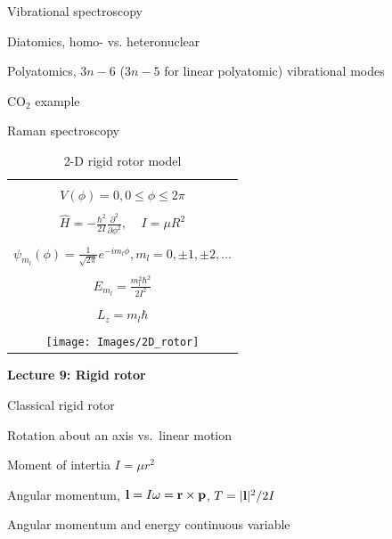 \documentclass[11pt]{article}
\begin{document}
\begin{outline}
\begin{outline}
    \item Vibrational spectroscopy
      \begin{outline}
        \item Diatomics, homo- vs. heteronuclear
        \item Polyatomics, $3n-6$ ($3n-5$ for linear polyatomic) vibrational modes
        \item CO$_2$ example
      \end{outline}

    \item Raman spectroscopy
 \end{outline}

\begin{table}[tbh]
   \begin{center}
   \caption{2-D rigid rotor model}
    \label{Rigid rotor}
\begin{tabular}[h]{|c|}
\hline
 \\
$\displaystyle       V(\phi) = 0, 0 \leq \phi \leq 2\pi $ \\
 \\
$\displaystyle \hat H = -\frac{\hbar^2}{2 I} \frac{\partial^2}{\partial
  \phi^2},\ \ \ \ \ I=\mu R^2
$\\
\\
$\displaystyle     \psi_{m_l}(\phi) = \frac{1}{\sqrt{2\pi}} e^{-i m_l \phi}, m_l
= 0, \pm 1, \pm 2, \ldots $ \\
\\
$\displaystyle     E_{m_l}=\frac{m_l^2 \hbar^2}{2 I^2}$ \\
 \\
$\displaystyle L_z = m_l \hbar$ \\
\\
     \texttt{[image: Images/2D\_rotor]} \\       
\hline
\end{tabular}
 \end{center}
\end{table}

\item{{\bf Lecture 9: Rigid rotor}}
  \begin{outline}
  \item Classical rigid rotor
    \begin{outline}
      \item Rotation about an axis vs.\ linear motion
      \item Moment of intertia $I=\mu r^2$
      \item Angular momentum, ${\bf l} = I {\bf \omega}= {\bf r}\times{\bf p}$, $T=|{\bf l}|^2/2 I$
      \item Angular momentum and energy continuous variable
    \end{outline}


\end{outline}
\end{outline}
\end{document}
